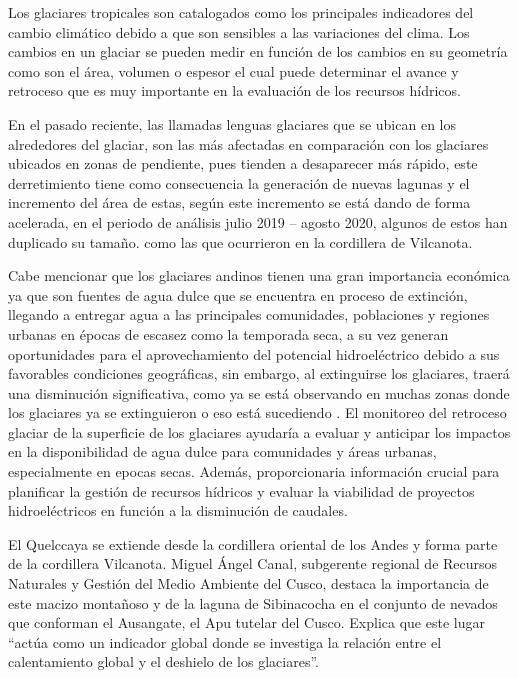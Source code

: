 Los glaciares tropicales son catalogados como los principales indicadores del cambio climático debido a que son sensibles a las variaciones del clima. Los cambios en un glaciar se pueden medir en función de los cambios en su geometría como son el área,  volumen o espesor el cual puede determinar el avance y retroceso que es muy importante en la evaluación de los recursos hídricos.

En el pasado reciente, las llamadas lenguas glaciares que se ubican en los alrededores del glaciar, son las más afectadas en comparación con los glaciares ubicados en zonas de pendiente, pues tienden a desaparecer más rápido, este derretimiento tiene como consecuencia la generación de nuevas lagunas y el incremento del área de estas, según \parencite{jimenez2021revision} este incremento se está dando de forma acelerada, en el periodo de análisis julio 2019 – agosto 2020, algunos de estos han duplicado su tamaño. como las que ocurrieron en la cordillera de Vilcanota.

Cabe mencionar que los glaciares andinos tienen una gran importancia económica ya que son fuentes de agua dulce que se encuentra en proceso de extinción, llegando a entregar agua a las principales comunidades, poblaciones y regiones urbanas en épocas de escasez como la temporada seca, a su vez generan oportunidades para el aprovechamiento del potencial hidroeléctrico debido a sus favorables condiciones geográficas, sin embargo, al extinguirse los glaciares, traerá una disminución significativa, como ya se está observando en muchas zonas donde los glaciares ya se extinguieron o eso está sucediendo \parencite{ramirez2008impactos}. El monitoreo del retroceso glaciar de la superficie de los glaciares ayudaría a evaluar y anticipar los impactos en la disponibilidad de agua dulce para comunidades y áreas urbanas, especialmente en epocas secas. Además, proporcionaria información crucial para planificar la gestión de recursos hídricos y evaluar la viabilidad de proyectos hidroeléctricos en función a la disminución de caudales.

El Quelccaya se extiende desde la cordillera oriental de los Andes y forma parte de la cordillera Vilcanota. Miguel Ángel Canal, subgerente regional de Recursos Naturales y Gestión del Medio Ambiente del Cusco, destaca la importancia de este macizo montañoso y de la laguna de Sibinacocha en el conjunto de nevados que conforman el Ausangate, el Apu tutelar del Cusco. Explica que este lugar “actúa como un indicador global donde se investiga la relación entre el calentamiento global y el deshielo de los glaciares”.

